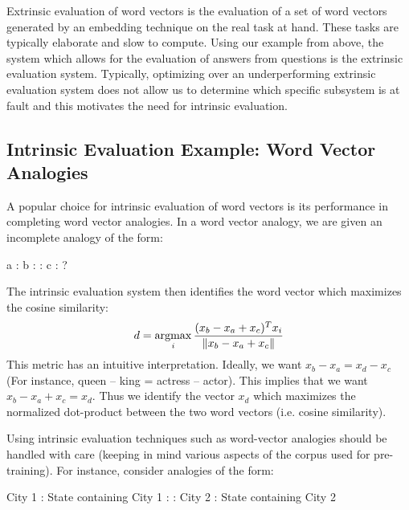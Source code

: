 \documentclass{tufte-handout}
\newcommand{\argmax}{\operatornamewithlimits{argmax}}
\begin{document}

Extrinsic evaluation of word vectors is the evaluation of a set of word vectors generated by an embedding technique on the real task at hand. These tasks are typically elaborate and slow to compute. Using our example from above, the system which allows for the evaluation of answers from questions is the extrinsic evaluation system. Typically, optimizing over an underperforming extrinsic evaluation system does not allow us to determine which specific subsystem is at fault and this motivates the need for intrinsic evaluation.

\subsection{Intrinsic Evaluation Example: Word Vector Analogies}
A popular choice for intrinsic evaluation of word vectors is its performance in completing word vector analogies. In a word vector analogy, we are given an incomplete analogy of the form:\\
\centerline{a : b : : c : ?}
The intrinsic evaluation system then identifies the word vector which maximizes the cosine similarity:
$$ d = \argmax_i \frac{(x_b - x_a + x_c)^Tx_i} {\|x_b - x_a + x_c\|}$$
This metric has an intuitive interpretation. Ideally, we want $x_b - x_a = x_d - x_c$ (For instance, queen -- king = actress -- actor). This implies that we want $x_b - x_a + x_c = x_d$. Thus we identify the vector $x_d$ which maximizes the normalized dot-product between the two word
vectors (i.e. cosine similarity).

Using intrinsic evaluation techniques such as word-vector analogies should be handled with care (keeping in mind various aspects of the corpus used for pre-training). For instance, consider analogies of the form:\\
\centerline{City 1 : State containing City 1 : : City 2 : State containing City 2}
\end{document}
